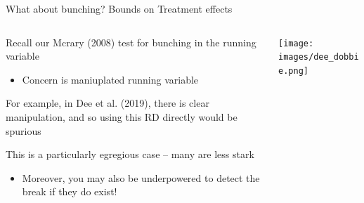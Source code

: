 \documentclass[notes,11pt, aspectratio=169]{beamer}
\newenvironment{wideitemize}{\itemize\addtolength{\itemsep}{10pt}}{\enditemize}
\begin{document}
\begin{frame}{What about bunching? Bounds on Treatment effects}
    \begin{columns}[onlytextwidth, T] %
      \begin{column}{.6\textwidth}
        \begin{wideitemize}
        \item Recall our Mcrary (2008) test for bunching in the running variable
          \begin{itemize}
          \item Concern is  maniuplated running variable
          \end{itemize}
        \item For example, in Dee et al. (2019), there is clear
          manipulation, and so using this RD directly would be
          spurious
        \item This is a particularly egregious case -- many are less stark
          \begin{itemize}
          \item Moreover, you may also be underpowered to detect the
            break if they do exist!
          \end{itemize}
        \end{wideitemize}
      \end{column}%
      \hfill%
      \begin{column}{.4\textwidth}
        \texttt{[image: images/dee\_dobbie.png]}
      \end{column}%
    \end{columns}  
  \end{frame}
\end{document}
